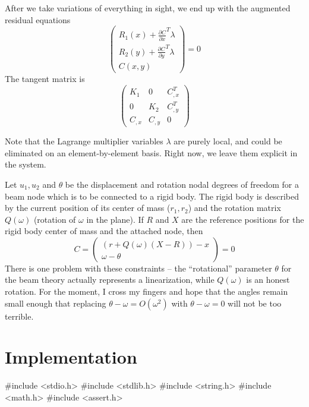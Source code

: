 After we take variations of everything in sight, we end up with
the augmented residual equations
\[
  \begin{pmatrix}
    R_1(x) + \frac{\partial C}{\partial x}^T \lambda \\
    R_2(y) + \frac{\partial C}{\partial y}^T \lambda \\
    C(x, y)
  \end{pmatrix} = 0
\]
The tangent matrix is
\[
  \begin{pmatrix}
       K_1 &      0 & C_{,x}^T \\
         0 &    K_2 & C_{,y}^T \\
    C_{,x} & C_{,y} &        0
  \end{pmatrix}
\]

Note that the Lagrange multiplier variables $\lambda$ are purely
local, and could be eliminated on an element-by-element basis.
Right now, we leave them explicit in the system.

Let $u_1, u_2$ and $\theta$ be the displacement and rotation
nodal degrees of freedom for a beam node which is to be connected 
to a rigid body.  The rigid body is described by the current position
of its center of mass ($r_1, r_2$) and the rotation matrix $Q(\omega)$
(rotation of $\omega$ in the plane).
If $R$ and $X$ are the reference positions for the rigid body
center of mass and the attached node, then
\[
  C = 
  \begin{pmatrix}
    (r + Q(\omega) (X-R)) - x \\
    \omega - \theta
  \end{pmatrix} = 0
\]
There is one problem with these constraints -- the ``rotational''
parameter $\theta$ for the beam theory actually represents a
linearization, while $Q(\omega)$ is an honest rotation.  For
the moment, I cross my fingers and hope that the angles remain small
enough that replacing $\theta - \omega = O(\omega^2)$ with
$\theta - \omega = 0$ will not be too terrible.



\section{Implementation}

\nwenddocs{}\endmoddef
#include <stdio.h>
#include <stdlib.h>
#include <string.h>
#include <math.h>
#include <assert.h>

